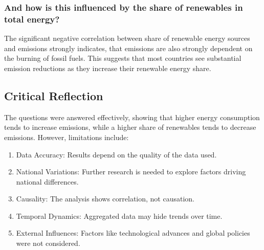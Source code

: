 \documentclass{article}
\begin{document}
\subsubsection*{And how is this influenced by the share of renewables in total energy?}
The significant negative correlation between share of renewable energy sources and emissions strongly indicates, that emissions are also strongly
dependent on the burning of fossil fuels.
This suggests that most countries see substantial emission reductions as they increase their renewable energy share.

\subsection*{Critical Reflection}
The questions were answered effectively, showing that higher energy consumption tends to increase emissions,
while a higher share of renewables tends to decrease emissions. However, limitations include:
\begin{enumerate}
    \item Data Accuracy: Results depend on the quality of the data used.
    \item National Variations: Further research is needed to explore factors driving national differences.
    \item Causality: The analysis shows correlation, not causation.
    \item Temporal Dynamics: Aggregated data may hide trends over time.
    \item External Influences: Factors like technological advances and global policies were not considered.
\end{enumerate}
\end{document}
